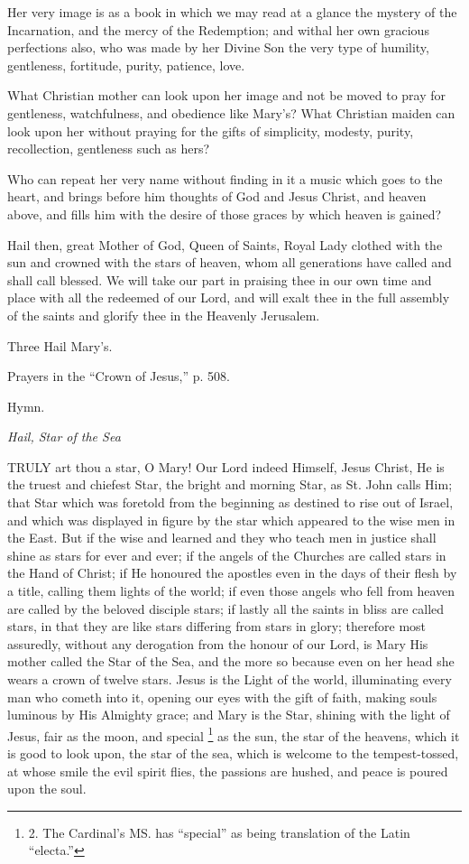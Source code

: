 Her very image is as a book in which we may read at
a glance the mystery of the Incarnation, and the mercy of the
Redemption; and withal her own gracious perfections also, who was made
by her Divine Son the very type of humility, gentleness, fortitude,
purity, patience, love.

What Christian mother can look upon her image and
not be moved to pray for gentleness, watchfulness, and obedience like
Mary’s? What Christian maiden can look upon her without praying for
the gifts of simplicity, modesty, purity, recollection, gentleness such
as hers?

Who can repeat her very name without finding in
it a music which goes to the heart, and brings before him thoughts
of God and Jesus Christ, and heaven above, and fills him with the desire
of those graces by which heaven is gained?

Hail then, great Mother of God, Queen of Saints,
Royal Lady clothed with the sun and crowned with the stars of heaven,
whom all generations have called and shall call blessed. We will take
our part in praising thee in our own time and place with all the
redeemed of our Lord, and will exalt thee in the full assembly of the
saints and glorify thee in the Heavenly Jerusalem.

Three Hail
Mary’s.

Prayers in the “Crown of Jesus,” p. 508.

Hymn.


\emph{Hail, Star of the Sea}

TRULY art
thou a star, O Mary! Our Lord indeed Himself, Jesus Christ, He is the
truest and chiefest Star, the bright and morning Star, as St. John calls
Him; that Star which was foretold from the beginning as destined to rise
out of Israel, and which was displayed in figure by the star which
appeared to the wise men in the East. But if the wise and learned and
they who teach men in justice shall shine as stars for ever and ever; if
the angels of the Churches are called stars in the Hand of Christ; if He
honoured the apostles even in the days of their flesh by a title,
calling them lights of the world; if even those angels who fell from
heaven are called by the beloved disciple stars; if lastly all the
saints in bliss are called stars, in that they are like stars differing
from stars in glory; therefore most assuredly, without any derogation
from the honour of our Lord, is Mary His mother called the Star of the
Sea, and the more so because even on her head she wears a crown of
twelve stars. Jesus is the Light of the world, illuminating every man
who cometh into it, opening our eyes with the gift of faith, making
souls luminous by His Almighty grace; and Mary is the Star, shining with
the light of Jesus, fair as the moon, and special \footnote{2.
The Cardinal’s MS. has “special” as being translation of the Latin
“electa.”} as the sun, the star of the heavens, which it is good to look
upon, the star of the sea, which is welcome to the tempest-tossed, at
whose smile the evil spirit flies, the passions are hushed, and peace is
poured upon the soul.

